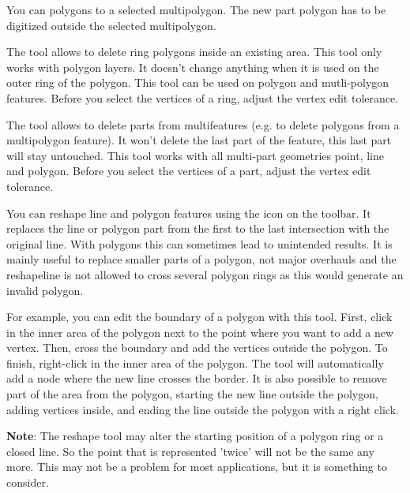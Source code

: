 You can  polygons to a selected multipolygon.
The new part polygon has to be digitized outside the selected multipolygon.


The  tool allows to delete ring
polygons inside an existing area. This tool only works with polygon layers.
It doesn't change anything when it is used on the outer ring of the polygon.
This tool can be used on polygon and mutli-polygon features. Before
you select the vertices of a ring, adjust the vertex edit tolerance.


The  tool allows to delete parts
from multifeatures (e.g. to delete polygons from a multipolygon feature). It
won't delete the last part of the feature, this last part will stay untouched.
This tool works with all multi-part geometries point, line and polygon. Before
you select the vertices of a part, adjust the vertex edit tolerance.


You can reshape line and polygon features using the
 icon on the toolbar. It
replaces the line or polygon part from the first to the last intersection
with the original line. With polygons this can sometimes lead to unintended
results. It is mainly useful to replace smaller parts of a polygon, not major
overhauls and the reshapeline is not allowed to cross several polygon rings
as this would generate an invalid polygon.

For example, you can edit the boundary of a polygon with this tool. First,
click in the inner area of the polygon next to the point where you want to 
add a new vertex. Then, cross the boundary and add the vertices outside the
polygon. To finish, right-click in the inner area of the polygon. The tool
will automatically add a node where the new line crosses the border. It is 
also possible to remove part of the area from the polygon, starting the new
line outside the polygon, adding vertices inside, and ending the line outside
the polygon with a right click.

\textbf{Note}: The reshape tool may alter the starting position of a polygon
ring or a closed line. So the point that is represented 'twice' will not be
the same any more. This may not be a problem for most applications, but it is
something to consider.

